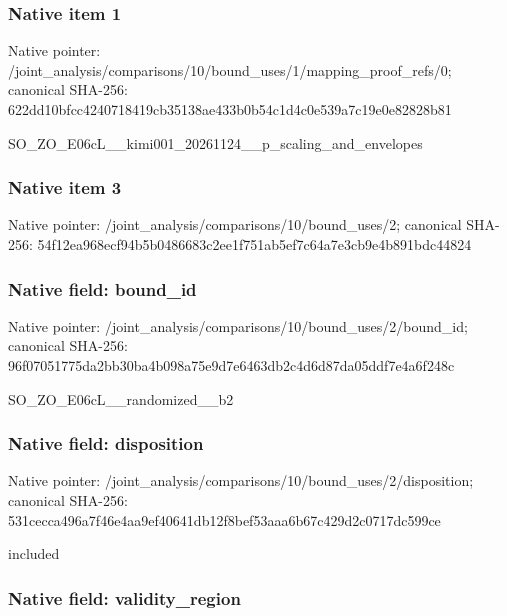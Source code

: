 \documentclass[10pt,a4paper]{article}
\begin{document}
\subsubsection{Native item 1}


Native pointer: /joint\_analysis/comparis\allowbreak{}ons/10/bound\_uses/1/mapp\allowbreak{}ing\_proof\_refs/0; canonical SHA-256: 622dd10bfcc4240718419cb3\allowbreak{}5138ae433b0b54c1d4c0e539\allowbreak{}a7c19e0e82828b81


SO\_ZO\_E06cL\_\_kimi001\_202\allowbreak{}61124\_\_p\_scaling\_and\_env\allowbreak{}elopes


\subsubsection{Native item 3}


Native pointer: /joint\_analysis/comparis\allowbreak{}ons/10/bound\_uses/2; canonical SHA-256: 54f12ea968ecf94b5b048668\allowbreak{}3c2ee1f751ab5ef7c64a7e3c\allowbreak{}b9e4b891bdc44824



\subsubsection{Native field: bound\_id}


Native pointer: /joint\_analysis/comparis\allowbreak{}ons/10/bound\_uses/2/boun\allowbreak{}d\_id; canonical SHA-256: 96f07051775da2bb30ba4b09\allowbreak{}8a75e9d7e6463db2c4d6d87d\allowbreak{}a05ddf7e4a6f248c


SO\_ZO\_E06cL\_\_randomized\_\_b2


\subsubsection{Native field: disposition}


Native pointer: /joint\_analysis/comparis\allowbreak{}ons/10/bound\_uses/2/disp\allowbreak{}osition; canonical SHA-256: 531cecca496a7f46e4aa9ef4\allowbreak{}0641db12f8bef53aaa6b67c4\allowbreak{}29d2c0717dc599ce


included


\subsubsection{Native field: validity\_region}
\end{document}
